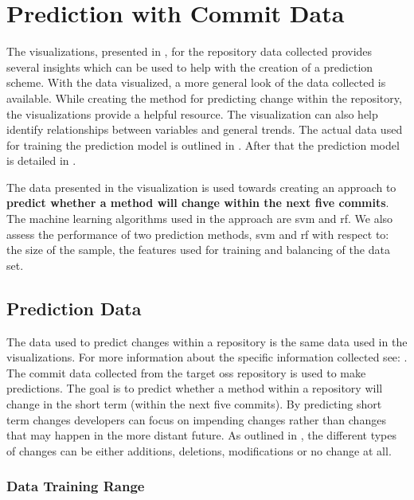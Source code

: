 \chapter{Prediction with Commit Data}
\label{chap:prediction}

The visualizations, presented in , for the repository data collected provides several insights which can be used to help with the creation of a prediction scheme. With the data visualized, a more general look of the data collected is available. While creating the method for predicting change within the repository, the visualizations provide a helpful resource. The visualization can also help identify relationships between variables and general trends. The actual data used for training the prediction model is outlined in . After that the prediction model is detailed in . %

The data presented in the visualization is used towards creating an approach to \textbf{predict whether a method will change within the next five commits}. The machine learning algorithms used in the approach are \gls{svm} and \gls{rf}. We also assess the performance of two prediction methods, \gls{svm} and \gls{rf} with respect to: the size of the sample, the features used for training and balancing of the data set.

\section{Prediction Data}
\label{sec:prediction_data}

The data used to predict changes within a repository is the same data used in the visualizations. For more information about the specific information collected see: . The commit data collected from the target \gls{oss} repository is used to make predictions. The goal is to predict whether a method within a repository will change in the short term (within the next five commits). By predicting short term changes developers can focus on impending changes rather than changes that may happen in the more distant future. As outlined in , the different types of changes can be either additions, deletions, modifications or no change at all.

\subsection{Data Training Range}

